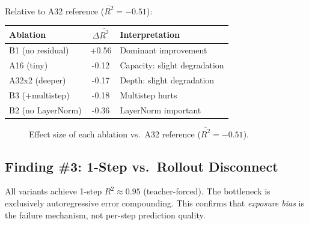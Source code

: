 \documentclass[11pt]{article}
\newcommand{\Rtwo}{R^2}
\begin{document}
Relative to A32 reference ($\overline{\Rtwo} = -0.51$):
\begin{center}
\begin{tabular}{lS[table-format=+1.2]l}
\toprule
Ablation & {$\Delta\overline{\Rtwo}$} & Interpretation \\
\midrule
B1 (no residual) & +0.56 & Dominant improvement \\
A16 (tiny)        & -0.12 & Capacity: slight degradation \\
A32x2 (deeper)    & -0.17 & Depth: slight degradation \\
B3 (+multistep)   & -0.18 & Multistep hurts \\
B2 (no LayerNorm) & -0.36 & LayerNorm important \\
\bottomrule
\end{tabular}
\end{center}

\begin{figure}[H]
\centering
{}
\caption{Effect size of each ablation vs.\ A32 reference ($\overline{\Rtwo}=-0.51$).}
\label{fig:effect-sizes}
\end{figure}


\subsection{Finding \#3: 1-Step vs.\ Rollout Disconnect}

All variants achieve 1-step $\Rtwo \approx 0.95$ (teacher-forced).
The bottleneck is exclusively autoregressive error compounding.
This confirms that \emph{exposure bias} is the failure mechanism,
not per-step prediction quality.
\end{document}
